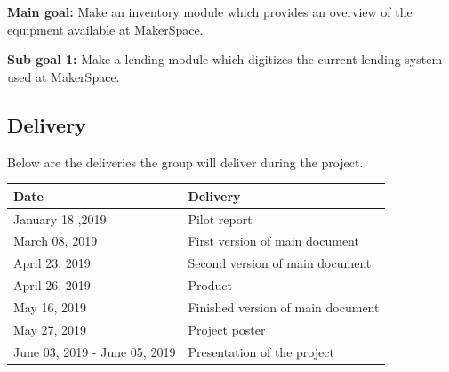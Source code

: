 
\textbf{Main goal:} Make an inventory module which provides an overview of the equipment available at MakerSpace.

\textbf{Sub goal 1:} Make a lending module which digitizes the current lending system used at MakerSpace.





\subsection{Delivery}

Below are the deliveries the group will deliver during the project.

\begin{tabu} to 1.2\textwidth { | X[l] | X[c] | }
    \hline
    \textbf{Date} & \textbf{Delivery} \\
    \hline
    January 18 ,2019 & Pilot report \\
    \hline
    March 08, 2019 & First version of main document \\
    \hline
    April 23, 2019 & Second version of main document \\
    \hline
    April 26, 2019 & Product \\
    \hline
    May 16, 2019 & Finished version of main document \\
    \hline
    May 27, 2019 & Project poster \\
    \hline
   June 03, 2019 - June 05, 2019 & Presentation of the project \\
    \hline
\end{tabu}
    
